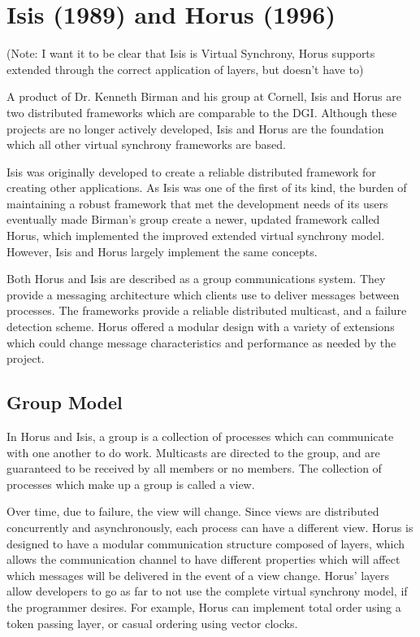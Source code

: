 \section{Isis (1989) and Horus (1996)}

(Note: I want it to be clear that Isis is Virtual Synchrony, Horus supports extended through the correct application of layers, but doesn't have to)

A product of Dr. Kenneth Birman and his group at Cornell, Isis \cite{ISISTOOLKIT} and Horus \cite{HORUSTOOLKIT} are
two distributed frameworks which are comparable to the DGI. Although these
projects are no longer actively developed, Isis and Horus are the foundation
which all other virtual synchrony frameworks are based.

Isis was originally developed to create a reliable distributed framework for
creating other applications. As Isis was one of the first of its kind, the
burden of maintaining a robust framework that met the development needs of its
users eventually made Birman's group create a newer, updated framework called
Horus, which implemented the improved extended virtual synchrony model. However, 
Isis and Horus largely implement the same concepts.

Both Horus and Isis are described as a group communications system. They provide a 
messaging architecture which clients use to deliver messages between processes.
The frameworks provide a reliable distributed multicast, and a failure
detection scheme. Horus offered a modular design with a variety of extensions
which could change message characteristics and performance as needed by the 
project.

\subsection{Group Model}
In Horus and Isis, a group is a collection of processes which can communicate with one
another to do work. Multicasts are directed to the group, and are guaranteed to
be received by all members or no members. The collection of processes which
make up a group is called a view.

Over time, due to failure, the view will change. Since views are distributed
concurrently and asynchronously, each process can have a different view. Horus
is designed to have a modular communication structure composed of layers, which 
allows the communication channel to have different properties which will affect
which messages will be delivered in the event of a view change. Horus' layers
allow developers to go as far to not use the complete virtual synchrony model,
if the programmer desires. For example, Horus can implement total order using
a token passing layer, or casual ordering using vector clocks.

